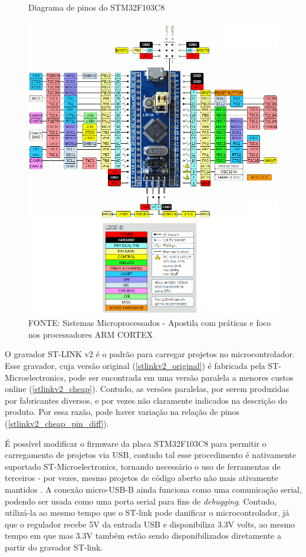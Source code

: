 \begin{figure}[ht]
	\centering
	\caption{Diagrama de pinos do STM32F103C8}
	\includegraphics[width=1.0\textwidth]{figures/stm32f1_pinout}
	\caption*{FONTE: Sistemas Microprocessados - Apostila com práticas e foco nos processadores ARM CORTEX \cite{apostila_microprossados}}
    \label{stm32f103c8_pinout}
\end{figure}

O gravador ST-LINK v2 é o padrão para carregar projetos no microcontrolador.
Esse gravador, cuja versão original (\autoref{stlinkv2_original}) é fabricada
pela ST-Microelectronics, pode ser encontrada em uma versão paralela a menores
custos online (\autoref{stlinkv2_cheap}). Contudo, as versões paralelas, por
serem produzidas por fabricantes diversos, e por vezes não claramente indicados 
na descrição do produto. Por essa razão, pode haver variação na relação de
pinos (\autoref{stlinkv2_cheap_pin_diff}).

É possível modificar o firmware da placa STM32F103C8 para permitir o
carregamento de projetos via USB, contudo tal esse procedimento
é nativamente suportado ST-Microelectronics, tornando necessário o uso de
ferramentas de terceiros - por vezes, mesmo projetos de código aberto não mais
ativamente mantidos \cite{stm32duino_bootloader}.
A conexão micro-USB-B ainda funciona como uma comunicação serial, podendo ser
usada como uma porta serial para fins de \textit{debugging}. Contudo, utilizá-la
ao mesmo tempo que o ST-link pode danificar o microcontrolador, já que o
regulador recebe 5V da entrada USB e disponibiliza 3.3V volts, ao mesmo tempo
em que mas 3.3V também estão sendo disponibilizados diretamente a partir do
gravador ST-link.

